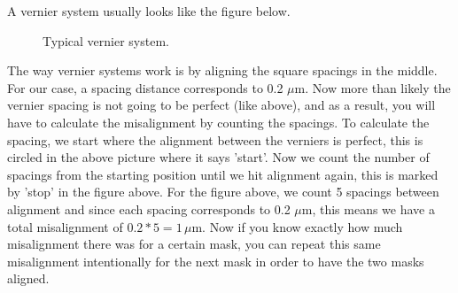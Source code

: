 \documentclass{article}
\begin{document}
A vernier system usually looks like the figure below.
\begin{figure}[H]
\centering
{}
\caption{Typical vernier system.}
\end{figure}
The way vernier systems work is by aligning the square spacings in the middle. For our case, a spacing distance corresponds to 0.2 $\mu$m. Now more than likely the vernier spacing is not going to be perfect (like above), and as a result, you will have to calculate the misalignment by counting the spacings. To calculate the spacing, we start where the alignment between the verniers is perfect, this is circled in the above picture where it says 'start'. Now we count the number of spacings from the starting position until we hit alignment again, this is marked by 'stop' in the figure above. For the figure above, we count 5 spacings between alignment and since each spacing corresponds to 0.2 $\mu$m, this means we have a total misalignment of $0.2*5 = 1\,\mu$m. Now if you know exactly how much misalignment there was for a certain mask, you can repeat this same misalignment intentionally for the next mask in order to have the two masks aligned.\\
\end{document}
